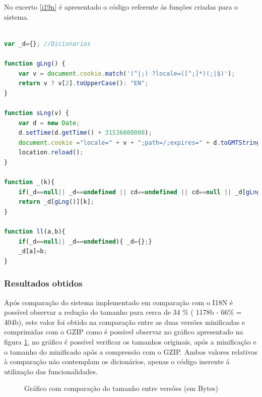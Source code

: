 \par No excerto \ref{i19n} é apresentado o código referente ás funções criadas para o sistema.

\begin{lstlisting}[caption=Definição do Sistema de Internacionalização,label={i19n},language=JavaScript]

var _d={}; //Dicionarios

function gLng() {
	var v = document.cookie.match('(^|;) ?locale=([^;]*)(;|$)');
    return v ? v[2].toUpperCase(): "EN";
}

function sLng(v) {
    var d = new Date;
    d.setTime(d.getTime() + 31536000000);
    document.cookie ="locale=" + v + ";path=/;expires=" + d.toGMTString();
    location.reload();
}

function _(k){
    if(_d==null|| _d==undefined || cd==undefined || cd==null || _d[gLng()]==null || _d[gLng()]==undefined) {return k;}
    return _d[gLng()][k];
}

function ll(a,b){
    if(_d==null|| _d==undefined){ _d={};}
    _d[a]=b;
}
\end{lstlisting}



\subsubsection{Resultados obtidos}
\par Após comparação do sistema implementado em comparação com o I18N\cite{i18n} é possível observar a redução do tamanho para cerca de 34 \% ( 1178b - 66\% = 404b), este valor foi obtido na comparação entre as duas versões minificadas e comprimidas com o GZIP como é possível observar no gráfico apresentado na figura \ref{garph1}, no gráfico é possível verificar os tamanhos originais, após a minificação e o tamanho do minificado após a compressão com o GZIP. Ambos valores relativos à comparação não contemplam os dicionários, apenas o código inerente á utilização das funcionalidades.

\begin{figure}[ht]
\centering
{}

\caption{Gráfico com comparação do tamanho entre versões (em Bytes)}\label{garph1}
\end{figure}

